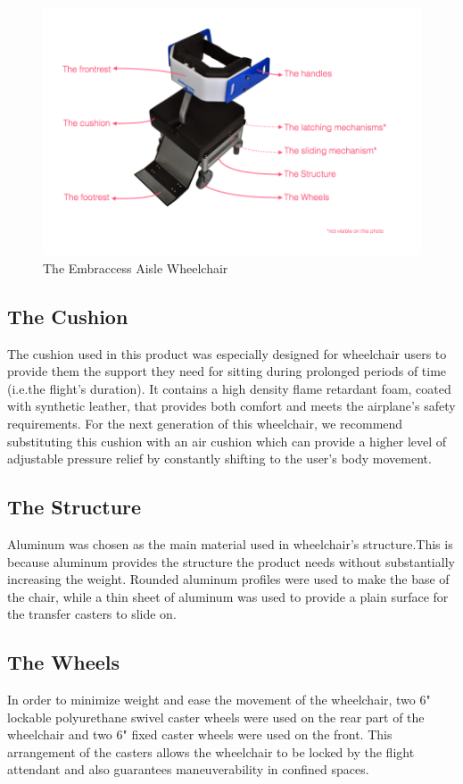 \begin{figure}[h]
\centering
\includegraphics[width=13cm]{images/AisleWheelchair1.png}
\caption{The Embraccess Aisle Wheelchair}
\label{fig:wheelchair}
\end{figure}


\subsection{The Cushion}

The cushion used in this product was especially designed for wheelchair users to provide them the support they need for sitting during prolonged periods of time (i.e.the  flight's duration). It contains a high density flame retardant foam, coated with synthetic leather, that provides both comfort and meets the airplane’s safety requirements. For the next generation of this wheelchair, we recommend substituting this cushion with an air cushion which can provide a higher level of adjustable pressure relief by constantly shifting to the user's body movement.

\subsection{The Structure}
Aluminum was chosen as the main material used in wheelchair’s  structure.This is because aluminum provides the structure the product needs without substantially increasing the weight. Rounded aluminum profiles were used to make the base of the chair, while a thin sheet of aluminum was used to provide a plain surface for the transfer casters to slide on.



\subsection{The Wheels}
In order to minimize weight and ease the movement of the wheelchair, two 6" lockable polyurethane swivel caster wheels were used on the rear part of the wheelchair and two 6" fixed caster wheels were used on the front. This arrangement of the casters allows the wheelchair to be locked by the flight attendant and also guarantees maneuverability in confined spaces.




